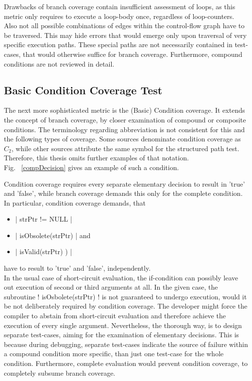	Drawbacks of branch coverage contain insufficient assessment of loops, as this metric only requires to execute a loop-body once, regardless of loop-counters. Also not all possible combinations of edges within the control-flow graph have to be traversed. This may hide errors that would emerge only upon traversal of very specific execution paths. These special paths are not necessarily contained in test-cases, that would otherwise suffice for branch coverage. Furthermore, compound conditions are not reviewed in detail. \\

	\subsection{Basic Condition Coverage Test}
	The next more sophisticated metric is the (Basic) Condition coverage. It extends the concept of branch coverage, by closer examination of compound or composite conditions. The terminology regarding abbreviation is not consistent for this and the following types of coverage. Some sources denominate condition coverage as $C_2$, while other sources attribute the same symbol for the structured path test. Therefore, this thesis omits further examples of that notation. \\
	Fig. ~\ref{compDecision} gives an example of such a condition. 
	
	
	Condition coverage requires every separate elementary decision to result in 'true' and 'false', while branch coverage demands this only for the complete condition. In particular, condition coverage demands, that 
	\begin{itemize} \setlength\itemsep{1px}
		\item \lstC |	strPtr != NULL 		|
		\item \lstC | 	isObsolete(strPtr)	| and
		\item \lstC | 	isValid(strPtr) )	|
	\end{itemize}
	have to result to 'true' and 'false', independently. \\

	In the usual case of short-circuit evaluation, the if-condition can possibly leave out execution of second or third arguments at all. In the given case, the subroutine \lstC ! isOsbolete(strPtr) ! is not guaranteed to undergo execution, would it be not deliberately required by condition coverage. The developer might force the compiler to abstain from short-circuit evaluation and therefore achieve the execution of every single argument. Nevertheless, the thorough way, is to design separate test-cases, aiming for the examination of elementary decisions. This is because during debugging, separate test-cases indicate the source of failure within a compound condition more specific, than just one test-case for the whole condition. Furthermore, complete evaluation would prevent condition coverage, to completely subsume branch coverage. \cite{Kalkov2013CodeCC}
	
